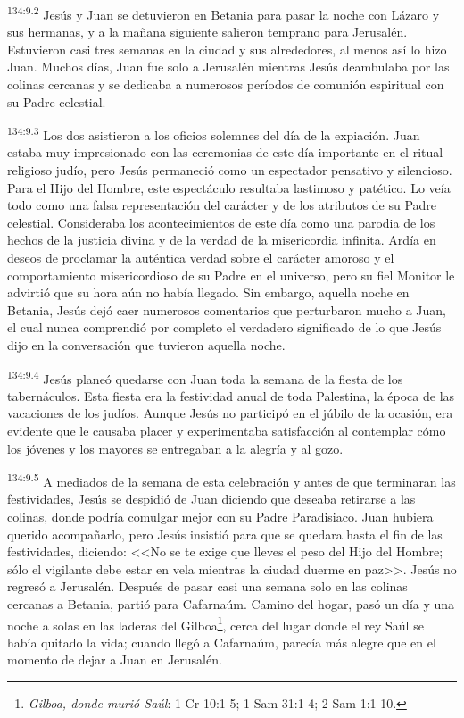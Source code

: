 \par 
\textsuperscript{134:9.2} Jesús y Juan se detuvieron en Betania para pasar la noche con Lázaro y sus hermanas, y a la mañana siguiente salieron temprano para Jerusalén. Estuvieron casi tres semanas en la ciudad y sus alrededores, al menos así lo hizo Juan. Muchos días, Juan fue solo a Jerusalén mientras Jesús deambulaba por las colinas cercanas y se dedicaba a numerosos períodos de comunión espiritual con su Padre celestial.

\par 
\textsuperscript{134:9.3} Los dos asistieron a los oficios solemnes del día de la expiación. Juan estaba muy impresionado con las ceremonias de este día importante en el ritual religioso judío, pero Jesús permaneció como un espectador pensativo y silencioso. Para el Hijo del Hombre, este espectáculo resultaba lastimoso y patético. Lo veía todo como una falsa representación del carácter y de los atributos de su Padre celestial. Consideraba los acontecimientos de este día como una parodia de los hechos de la justicia divina y de la verdad de la misericordia infinita. Ardía en deseos de proclamar la auténtica verdad sobre el carácter amoroso y el comportamiento misericordioso de su Padre en el universo, pero su fiel Monitor le advirtió que su hora aún no había llegado. Sin embargo, aquella noche en Betania, Jesús dejó caer numerosos comentarios que perturbaron mucho a Juan, el cual nunca comprendió por completo el verdadero significado de lo que Jesús dijo en la conversación que tuvieron aquella noche.

\par 
\textsuperscript{134:9.4} Jesús planeó quedarse con Juan toda la semana de la fiesta de los tabernáculos. Esta fiesta era la festividad anual de toda Palestina, la época de las vacaciones de los judíos. Aunque Jesús no participó en el júbilo de la ocasión, era evidente que le causaba placer y experimentaba satisfacción al contemplar cómo los jóvenes y los mayores se entregaban a la alegría y al gozo.

\par 
\textsuperscript{134:9.5} A mediados de la semana de esta celebración y antes de que terminaran las festividades, Jesús se despidió de Juan diciendo que deseaba retirarse a las colinas, donde podría comulgar mejor con su Padre Paradisiaco. Juan hubiera querido acompañarlo, pero Jesús insistió para que se quedara hasta el fin de las festividades, diciendo: <<No se te exige que lleves el peso del Hijo del Hombre; sólo el vigilante debe estar en vela mientras la ciudad duerme en paz>>. Jesús no regresó a Jerusalén. Después de pasar casi una semana solo en las colinas cercanas a Betania, partió para Cafarnaúm. Camino del hogar, pasó un día y una noche a solas en las laderas del Gilboa\footnote{\textit{Gilboa, donde murió Saúl}: 1 Cr 10:1-5; 1 Sam 31:1-4; 2 Sam 1:1-10.}, cerca del lugar donde el rey Saúl se había quitado la vida; cuando llegó a Cafarnaúm, parecía más alegre que en el momento de dejar a Juan en Jerusalén.

